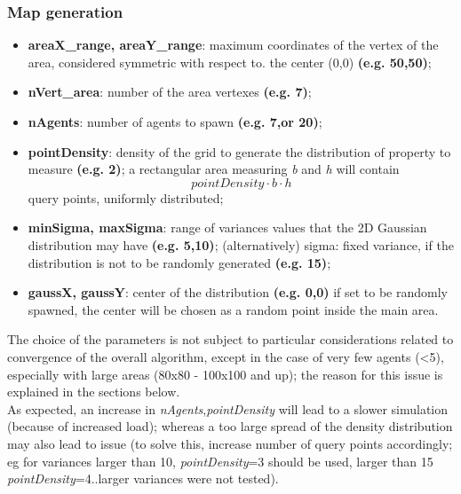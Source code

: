 \documentclass[a4paper,11pt,oneside]{book}
\begin{document}
	\subsubsection{Map generation}
	\begin{itemize}
		\item \textbf{areaX\_range, areaY\_range}: maximum coordinates of the vertex of the area, considered symmetric with respect to. the center (0,0) \textbf{(e.g. 50,50)};
		
		\item \textbf{nVert\_area}: number of the area vertexes \textbf{(e.g. 7)};
		
		\item \textbf{nAgents}: number of agents to spawn \textbf{(e.g. 7,or 20)};
		\\
		
		\item \textbf{pointDensity}: density of the grid to generate the distribution of property to measure \textbf{(e.g. 2)}; a rectangular area measuring \textit{b} and \textit{h} will contain $$\mathit{pointDensity}\cdot b\cdot h$$ query points, uniformly distributed;
		
		\item \textbf{minSigma, maxSigma}: range of variances values that the 2D Gaussian distribution may have \textbf{(e.g. 5,10)};
		\subitem (alternatively) sigma: fixed variance, if the distribution is not to be randomly generated \textbf{(e.g. 15)};
		
		\item \textbf{gaussX, gaussY}: center of the distribution \textbf{(e.g. 0,0)}
		\subitem if set to be randomly spawned, the center will be chosen as a random point inside the main area.
		
	\end{itemize}
	The choice of the parameters is not subject to particular considerations related to convergence of the overall algorithm, except in the case of very few agents (<5), especially with large areas (80x80 - 100x100 and up); the reason for this issue is explained in the sections below.\\
	
	As expected, an increase in \emph{nAgents},\emph{pointDensity} will lead to a slower simulation (because of increased load); whereas a too large spread of the density distribution may also lead to issue (to solve this, increase number of query points accordingly; eg for variances larger than 10, \emph{pointDensity}=3 should be used, larger than 15 \emph{pointDensity}=4..larger variances were not tested).\\
	
\end{document}
